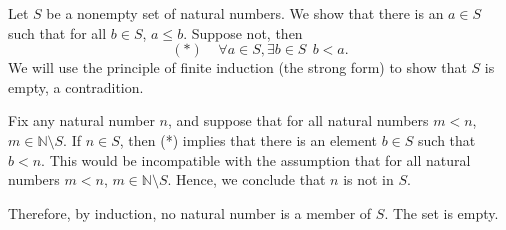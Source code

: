 \documentclass[12pt]{article}
\begin{document}
Let $S$ be a nonempty set of natural numbers. We show that there is an $a\in S$ such that for all $b\in S$, $a\leq b$. Suppose not, then
$$(*)\ \ \ \ \ \forall a\in S,\exists b\in S\ \ b<a.$$
We will use the principle of finite induction (the strong form) to  show that $S$ is empty, a contradition.

Fix any natural number $n$, and suppose that for all natural numbers $m<n$, $m\in \mathbb{N}\setminus S$. If $n\in S$, then (*) implies that there is an element $b\in S$ such that $b< n$. This would be incompatible with the assumption that for all natural numbers $m<n$, $m\in \mathbb{N}\setminus S$.
Hence, we conclude that $n$ is not in $S$.

Therefore, by induction, no natural number is a member of $S$. The set is empty.
\end{document}
